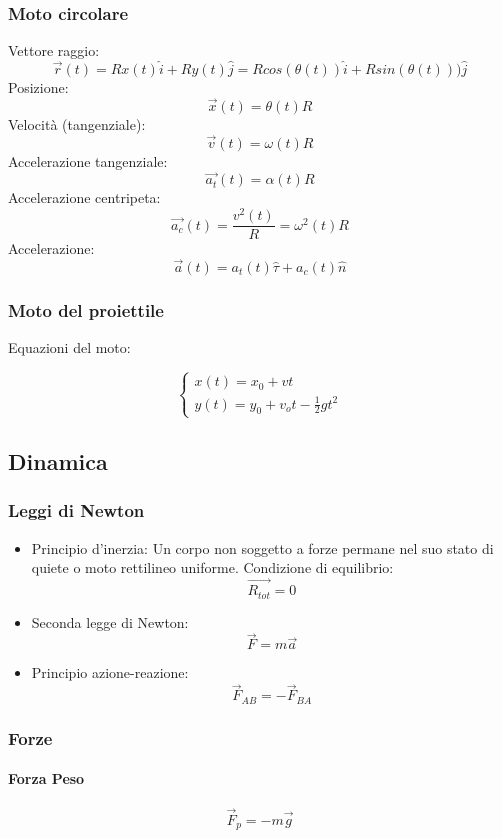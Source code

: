 \documentclass[12pt]{article}
\begin{document}
        \subsubsection{Moto circolare}
            Vettore raggio: \[\vec{r}(t) = Rx(t)\hat{i} + Ry(t)\hat{j} = Rcos(\theta(t))\hat{i} + Rsin(\theta(t)))\hat{j}\]
            Posizione: \[\vec{x}(t) = \theta(t)R\]
            Velocità (tangenziale): \[\vec{v}(t) = \omega(t) R\]
            Accelerazione tangenziale: \[\vec{a_t}(t) = \alpha(t) R\]
            Accelerazione centripeta: \[\vec{a_c}(t) = \frac{v^2(t)}{R} = \omega^2(t){R}\]
            Accelerazione: \[\vec{a}(t) = a_t(t)\hat{\tau} + a_c(t)\hat{n} \]         
        \subsubsection{Moto del proiettile}
            Equazioni del moto:
            
            \begin{equation*}
                \left\{
                \begin{array}{l}
                x(t) = x_0 + vt\\
                y(t) = y_0 + v_ot - \frac{1}{2}gt^2 
                \end{array}
                \right.
                \end{equation*}
    \subsection{Dinamica}
        \subsubsection{Leggi di Newton}
        \begin{itemize}
            \item Principio d'inerzia:  Un corpo non soggetto a forze permane nel suo stato di
            quiete o moto rettilineo uniforme. Condizione di equilibrio: \[\vec{R_{tot}} = 0\]
            \item Seconda legge di Newton: \[\vec{F} = m\vec{a}\]
            \item Principio azione-reazione: \[\vec{F}_{AB} = -\vec{F}_{BA}\]
        \end{itemize}
        \subsubsection{Forze}
            \paragraph*{Forza Peso}
            \[\vec{F}_p = - m\vec{g}\]
\end{document}
